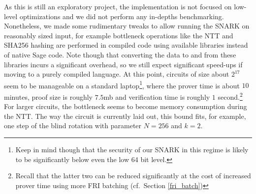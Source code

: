 \documentclass[final]{zamarep}
\begin{document}
As this is still an exploratory project, the implementation is not focused on low-level optimizations and we did not perform any in-depths benchmarking. Nonetheless, we made some rudimentary tweaks to allow running the SNARK on reasonably sized input, for example bottleneck operations like the NTT and SHA256 hashing are performed in compiled code using available libraries instead of native Sage code. Note though that converting the data to and from these libraries incurs a significant overhead, so we still expect significant speed-ups if moving to a purely compiled language. At this point, circuits of size about $2^{17}$ seem to be manageable on a standard laptop\footnote{Keep in mind though that the security of our SNARK in this regime is likely to be significantly below even the low 64 bit level.}, where the prover time is about $10$ minutes, proof size is roughly $7.5$mb and verification time is roughly $1$ second.\footnote{Recall that the latter two can be reduced significantly at the cost of increased prover time using more FRI batching (cf.\ Section \ref{fri_batch})} For larger circuits, the bottleneck seems to become memory consumption during the NTT. The way the circuit is currently laid out, this bound fits, for example, one step of the blind rotation with parameter $N=256$ and $k=2$. 



\end{document}
